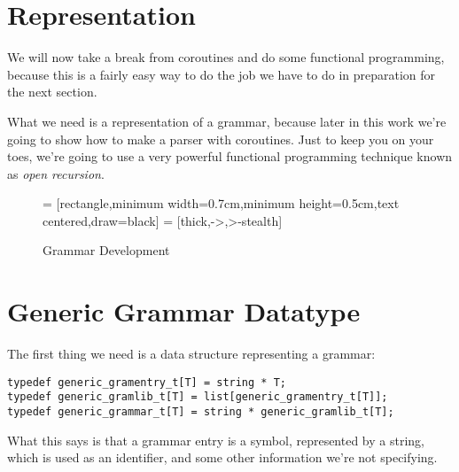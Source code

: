 \documentclass[oneside]{book}
\begin{document}
\section{Representation}
We will now take a break from coroutines and do some functional
programming, because this is a fairly easy way to do the job
we have to do in preparation for the next section.

What we need is a representation of a grammar, because later in this
work we're going to show how to make a parser with coroutines.
Just to keep you on your toes, we're going to use a very powerful
functional programming technique known as {\em open recursion}.

\begin{figure}[h]
\begin{center}
 = [rectangle,minimum width=0.7cm,minimum height=0.5cm,text centered,draw=black]
 = [thick,->,>-stealth]
\caption{Grammar Development}
\label{fig:grammar development}
\end{center}
\end{figure}


\section{Generic Grammar Datatype}
The first thing we need is a data structure representing a grammar:

\begin{verbatim}
typedef generic_gramentry_t[T] = string * T;
typedef generic_gramlib_t[T] = list[generic_gramentry_t[T]];
typedef generic_grammar_t[T] = string * generic_gramlib_t[T];
\end{verbatim}

What this says is that a grammar entry is a symbol, represented by
a string, which is used as an identifier, and some other 
information we're not specifying.  
\end{document}
